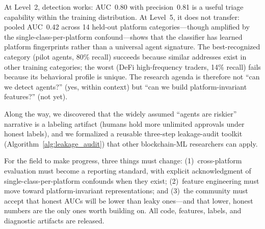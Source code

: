 \documentclass[sigconf,nonacm=false]{acmart}
\begin{document}
At Level~2, detection works: AUC~0.80 with precision~0.81 is a useful triage capability within the training distribution. At Level~5, it does not transfer: pooled AUC~0.42 across 14 held-out platform categories---though amplified by the single-class-per-platform confound---shows that the classifier has learned platform fingerprints rather than a universal agent signature. The best-recognized category (pilot agents, 80\% recall) succeeds because similar addresses exist in other training categories; the worst (DeFi high-frequency traders, 14\% recall) fails because its behavioral profile is unique. The research agenda is therefore not ``can we detect agents?'' (yes, within context) but ``can we build platform-invariant features?'' (not yet).

Along the way, we discovered that the widely assumed ``agents are riskier'' narrative is a labeling artifact (humans hold more unlimited approvals under honest labels), and we formalized a reusable three-step leakage-audit toolkit (Algorithm~\ref{alg:leakage_audit}) that other blockchain-ML researchers can apply.

For the field to make progress, three things must change: (1)~cross-platform evaluation must become a reporting standard, with explicit acknowledgment of single-class-per-platform confounds when they exist; (2)~feature engineering must move toward platform-invariant representations; and (3)~the community must accept that honest AUCs will be lower than leaky ones---and that lower, honest numbers are the only ones worth building on. All code, features, labels, and diagnostic artifacts are released.




\end{document}
